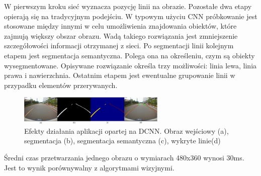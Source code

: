 W pierwszym kroku sieć wyznacza pozycję linii na obrazie. 
Pozostałe dwa etapy opierają się na tradycyjnym podejściu. 
W typowym użyciu CNN próbkowanie jest stosowane między innymi w celu umożliwienia znajdowania obiektów, które zajmują większy obszar obrazu. %
Wadą takiego rozwiązania jest zmniejszenie szczegółowości informacji otrzymanej z sieci.
Po segmentacji linii kolejnym etapem jest segmentacja semantyczna. 
Polega ona na określeniu, czym są obiekty wysegmentowane. 
Opisywane rozwiązanie określa trzy możliwości: linia lewa, linia prawa i nawierzchnia. 
Ostatnim etapem jest ewentualne grupowanie linii w przypadku elementów przerywanych.

\begin{figure}
  \centering
  \includegraphics[width=7cm]{img/lane_detection3_cnn_results.png}
  \caption{Efekty działania aplikacji opartej na DCNN. Obraz wejściowy (a), segmentacja (b), segmentacja semantyczna (c), wykryte linie(d)\cite{T6}}
  \label{fig:lane_detection3_cnn_results}
\end{figure}

Średni czas przetwarzania jednego obrazu o wymiarach 480x360 wynosi 30ms. Jest to wynik porównywalny z algorytmami wizyjnymi.


